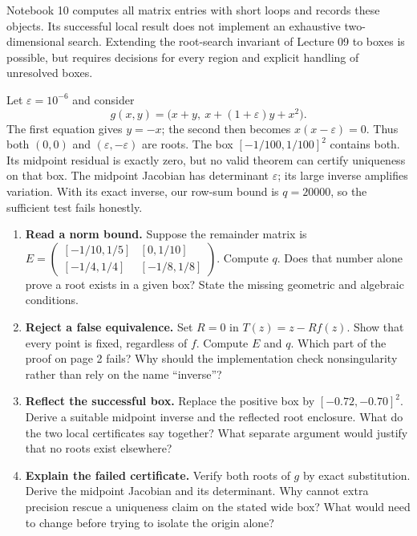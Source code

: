Notebook 10 computes all matrix entries with short loops and records these
objects. Its successful local result does not implement an exhaustive
two-dimensional search. Extending the root-search invariant of Lecture 09
to boxes is possible, but requires decisions for every region and explicit
handling of unresolved boxes.

\newpage
{}
Let $\varepsilon=10^{-6}$ and consider
\[
 g(x,y)=\bigl(x+y,\ x+(1+\varepsilon)y+x^2\bigr).
\]
The first equation gives $y=-x$; the second then becomes
$x(x-\varepsilon)=0$. Thus both $(0,0)$ and
$(\varepsilon,-\varepsilon)$ are roots. The box $[-1/100,1/100]^2$
contains both. Its midpoint residual is exactly zero, but no valid theorem
can certify uniqueness on that box. The midpoint Jacobian has determinant
$\varepsilon$; its large inverse amplifies variation. With its exact inverse,
our row-sum bound is $q=20000$, so the sufficient test fails honestly.

\begin{enumerate}
\item \textbf{Read a norm bound.} Suppose the remainder matrix is
$E=\left(\begin{smallmatrix}[-1/10,1/5]&[0,1/10]\\{}[-1/4,1/4]&[-1/8,1/8]\end{smallmatrix}\right)$.
Compute $q$. Does that number alone prove a root exists in a given box?
State the missing geometric and algebraic conditions.

\item \textbf{Reject a false equivalence.} Set $R=0$ in $T(z)=z-Rf(z)$.
Show that every point is fixed, regardless of $f$. Compute $E$ and $q$.
Which part of the proof on page 2 fails? Why should the implementation
check nonsingularity rather than rely on the name ``inverse''?

\item \textbf{Reflect the successful box.} Replace the positive box by
$[-0.72,-0.70]^2$. Derive a suitable midpoint inverse and the reflected
root enclosure. What do the two local certificates say together? What
separate argument would justify that no roots exist elsewhere?

\item \textbf{Explain the failed certificate.} Verify both roots of $g$
by exact substitution. Derive the midpoint Jacobian and its determinant.
Why cannot extra precision rescue a uniqueness claim on the stated wide
box? What would need to change before trying to isolate the origin alone?
\end{enumerate}

